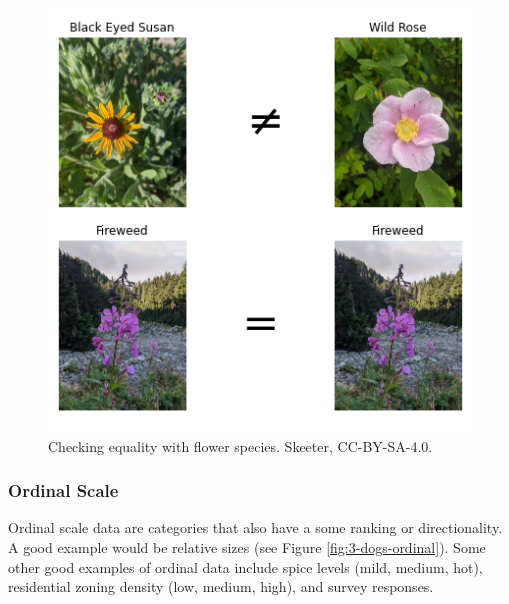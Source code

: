 \documentclass[
]{book}
\begin{document}
\begin{figure}
\includegraphics[width=0.75\linewidth]{images/03-nominal-operations} \caption{Checking equality with flower species. Skeeter, CC-BY-SA-4.0.}\label{fig:3-nominal-operations}
\end{figure}

\subsubsection{Ordinal Scale}\label{ordinal-scale}

Ordinal scale data are categories that also have a some ranking or directionality. A good example would be relative sizes (see Figure \ref{fig:3-dogs-ordinal}). Some other good examples of ordinal data include spice levels (mild, medium, hot), residential zoning density (low, medium, high), and survey responses.
\end{document}
